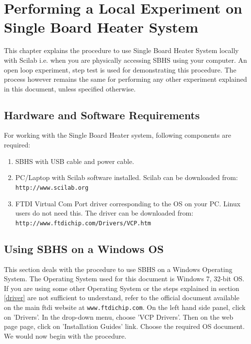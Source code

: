 \chapter{Performing a Local Experiment on Single Board Heater System}\label{sercomm}
This chapter explains the procedure to use Single Board Heater System locally with Scilab i.e. when you are physically accessing SBHS using your computer. An open loop experiment, step test is used for demonstrating this procedure. The process however remains the same for performing any other experiment explained in this document, unless specified otherwise. 
\section*{Hardware and Software Requirements}\label{umlauts}
For working with the Single Board Heater system, following components are required:

\begin{enumerate}
\item SBHS with USB cable and power cable.
\item PC/Laptop with Scilab software installed. Scilab can be downloaded from:\\ {\tt http://www.scilab.org}
\item FTDI Virtual Com Port driver corresponding to the OS on your PC. Linux users do not need this. The driver can be downloaded from:\\
{\tt http://www.ftdichip.com/Drivers/VCP.htm}

\end{enumerate}


\section{Using SBHS on a Windows OS}
\label{win_procedure}
This section deals with the procedure to use SBHS on a Windows Operating System. The Operating System used for this document is Windows 7, 32-bit OS. If you are using some other Operating System or the steps explained in section \ref{driver} are not sufficient to understand, refer to the official document available on the main ftdi website at {\tt www.ftdichip.com}. On the left hand side panel, click on 'Drivers'. In the drop-down menu, choose 'VCP Drivers'. Then on the web page page, click on 'Installation Guides' link. Choose the required OS document. We would now begin with the procedure.
